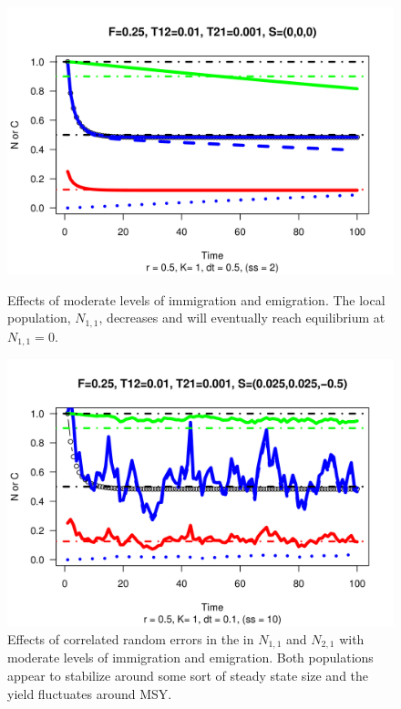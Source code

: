 \documentclass[12pt,letterpaper]{article}
\newcommand\None{{N_{1,1}}}
\newcommand\Ntwo{{N_{2,1}}}
\begin{document}
\begin{figure}
\begin{center}
\includegraphics[height=0.7\textwidth]{./graphics/r05F025T12001T210001S000.png}\\
\caption{\label{fig:emandimm}
Effects of moderate levels of immigration and emigration. The local
population, $\None$, decreases and will eventually reach equilibrium
at $\None = 0$.
}
\end{center}
\end{figure}

\begin{figure}
\begin{center}
\includegraphics[height=0.7\textwidth]{./graphics/r05F025T12001T210001S00250025-05.png}
\caption{\label{fig:variance}
Effects of correlated random errors in the in $\None$ and $\Ntwo$ with
moderate levels of immigration and emigration.
Both populations appear to stabilize around some sort of steady
state size and the yield fluctuates around MSY.
}
\end{center}
\end{figure}
\end{document}
